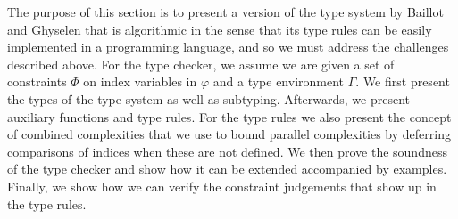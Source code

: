 %

The purpose of this section is to present a version of the type system by Baillot and Ghyselen that is algorithmic in the sense that its type rules can be easily implemented in a programming language, and so we must address the challenges described above. For the type checker, we assume we are given a set of constraints $\Phi$ on index variables in $\varphi$ and a type environment $\Gamma$. We first present the types of the type system as well as subtyping. Afterwards, we present auxiliary functions and type rules. For the type rules we also present the concept of combined complexities that we use to bound parallel complexities by deferring comparisons of indices when these are not defined. We then prove the soundness of the type checker and show how it can be extended accompanied by examples. Finally, we show how we can verify the constraint judgements that show up in the type rules.








